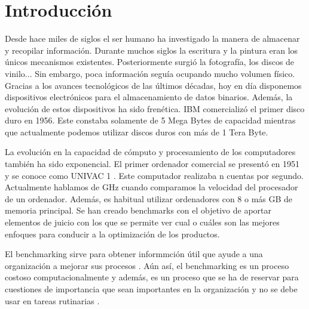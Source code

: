 \documentclass{article}
\begin{document}
\maketitle



\newpage
\tableofcontents
\newpage


\section{Introducción}

	Desde hace miles de siglos el ser humano ha investigado la manera de almacenar y recopilar información. Durante muchos siglos la escritura y la pintura eran los únicos mecanismos existentes. Posteriormente surgió la fotografía, los discos de vinilo... Sin embargo, poca información seguía ocupando mucho volumen físico. Gracias a los avances tecnológicos de las últimos décadas, hoy en día disponemos dispositivos electrónicos para el almacenamiento de datos binarios. Además, la evolución de estos dispositivos ha sido frenética. IBM comercializó el primer disco duro en 1956. Este constaba solamente de 5 Mega Bytes de capacidad \cite{hard-disks} mientras que actualmente podemos utilizar discos duros con más de 1 Tera Byte.

	La evolución en la capacidad de cómputo y procesamiento de los computadores también ha sido exponencial. El primer ordenador comercial se presentó en 1951 y se conoce como  UNIVAC 1 \cite{first-commercial-computer}. Este computador realizaba n cuentas por segundo. Actualmente hablamos de GHz cuando comparamos la velocidad del procesador de un ordenador. Además, es habitual utilizar ordenadores con 8 o más GB de memoria principal. Se han creado benchmarks con el objetivo de aportar elementos de juicio con los que se permite ver cual o cuáles son las mejores enfoques para conducir a la optimización de los productos. 

	El benchmarking sirve para obtener informmción útil que ayude a una organización a mejorar sus procesos \cite{benchmarking}. Aún así, el benchmarking es un proceso costoso computacionalmente y además, es un proceso que se ha de reservar para cuestiones de importancia que sean importantes en la organización y no se debe usar en tareas rutinarias \cite{desv-bench}.
\end{document}
